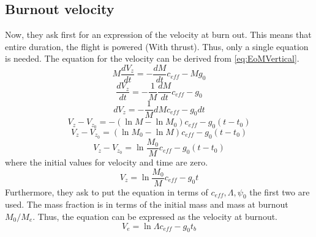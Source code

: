 \subsection*{Burnout velocity}
Now, they ask first for an expression of the velocity at burn out. This means that entire duration, the flight is powered (With thrust). Thus, only a single equation is needed. The equation for the velocity can be derived from \cref{eq:EoMVertical}. 
\begin{equation}
M\frac{dV_z}{dt}=-\frac{dM}{dt}c_{eff}-Mg_0
\end{equation}
\begin{equation}
\frac{dV_z}{dt}=-\frac{1}{M}\frac{dM}{dt}c_{eff}-g_0
\end{equation}
\begin{equation}
dV_z=-\frac{1}{M}{dM}c_{eff}-g_0dt
\end{equation}
\begin{equation}
V_z-V_{z_0}=-(\ln M- \ln M_0)c_{eff}-g_0(t-t_0)
\end{equation}
\begin{equation}
V_z-V_{z_0}=(\ln M_0- \ln M)c_{eff}-g_0(t-t_0)
\end{equation}
\begin{equation}
V_z-V_{z_0}=\ln\frac{M_0}{M}c_{eff}-g_0(t-t_0)
\end{equation}
where the initial values for velocity and time are zero.
\begin{equation}
V_z=\ln\frac{M_0}{M}c_{eff}-g_0t
\end{equation}
Furthermore, they ask to put the equation in terms of $c_{eff}, \Lambda, \psi_0$ the first two are used. The mass fraction is in terms of the initial mass and mass at burnout $M_0/M_e$. Thus, the equation can be expressed as the velocity at burnout.
\begin{equation}
V_e=\ln\Lambda c_{eff}-g_0t_b
\end{equation}

